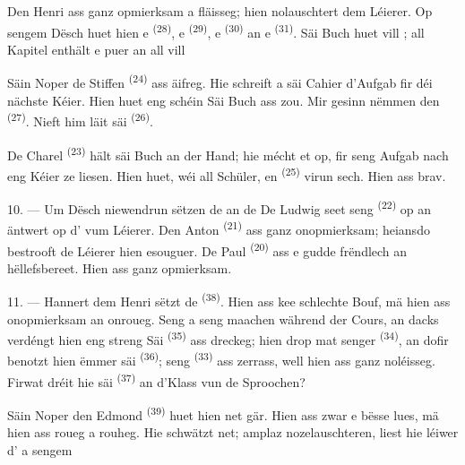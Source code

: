Den Henri ass ganz opmierksam a fläisseg; hien nolauschtert dem Léierer. Op sengem
Dësch huet hien e  \textsuperscript{(28)}, e 
\textsuperscript{(29)}, e  \textsuperscript{(30)} an e
 \textsuperscript{(31)}. Säi Buch huet vill ; all
Kapitel enthält e puer  an all  vill

Säin Noper de Stiffen \textsuperscript{(24)} ass äifreg. Hie schreift a säi Cahier
d'Aufgab fir déi nächste Kéier. Hien huet eng schéin  Säi Buch ass
zou. Mir gesinn nëmmen den  \textsuperscript{(27)}. Nieft him läit säi
 \textsuperscript{(26)}.

De Charel \textsuperscript{(23)} hält säi Buch an der Hand; hie mécht et op, fir seng
Aufgab nach eng Kéier ze liesen. Hien huet, wéi all Schüler, en
 \textsuperscript{(25)} virun sech. Hien ass brav.

10. --- Um Dësch niewendrun sëtzen de  an de 
De Ludwig seet seng  \textsuperscript{(22)} op an äntwert op
d' vum Léierer. Den Anton \textsuperscript{(21)} ass ganz onopmierksam;
heiansdo bestrooft de Léierer hien esouguer. De Paul \textsuperscript{(20)} ass e
gudde  frëndlech an hëllefsbereet. Hien ass ganz opmierksam.

\VUsaut{4.2mm}
\VUsaut{3.2mm}

11. --- Hannert dem Henri sëtzt de  \textsuperscript{(38)}. Hien ass
kee schlechte Bouf, mä hien ass  onopmierksam an onroueg. Seng
 a seng  maachen
 während der Cours, an dacks verdéngt hien eng streng
 Säi  \textsuperscript{(35)} ass dreckeg; hien
 drop mat senger  \textsuperscript{(34)}, an
dofir benotzt hien ëmmer säi  \textsuperscript{(36)}; seng
 \textsuperscript{(33)} ass zerrass, well hien ass ganz
noléisseg. Firwat dréit hie säi  \textsuperscript{(37)} an
d'Klass vun de  Sproochen?

Säin Noper den Edmond \textsuperscript{(39)} huet hien net gär. Hien ass zwar e bësse
lues, mä hien ass roueg a rouheg. Hie schwätzt net; amplaz nozelauschteren, liest hie
léiwer d' a sengem 

